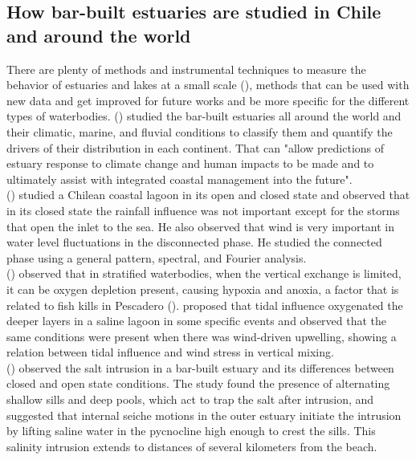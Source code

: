 \documentclass[11pt,letterpaper]{article}
\begin{document}
\subsection{How bar-built estuaries are studied in Chile and around the world}

There are plenty of methods and instrumental techniques to measure the behavior of estuaries and lakes at a small scale (\cite{Wuest2003}), methods that can be used with new data and get improved for future works and be more specific for the different types of waterbodies. \citeauthor{mcsweeney2017intermittently} (\cite*{mcsweeney2017intermittently}) studied the bar-built estuaries all around the world and their climatic, marine, and fluvial conditions to classify them and quantify the drivers of their distribution in each continent. That can "allow predictions of estuary response to climate change and human impacts to be made and to ultimately assist with integrated coastal management into the future".\\

\citeauthor{dussaillant2009} (\cite*{dussaillant2009}) studied a Chilean coastal lagoon in its open and closed state and observed that in its closed state the rainfall influence was not important except for the storms that open the inlet to the sea. He also observed that wind is very important in water level fluctuations in the disconnected phase. He studied the connected phase using a general pattern, spectral, and Fourier analysis.\\

\citeauthor{Kelly2018} (\cite*{Kelly2018}) observed that in stratified waterbodies, when the vertical exchange is limited, it can be oxygen depletion present, causing hypoxia and anoxia, a factor that is related to fish kills in Pescadero (\cite{largier2015}). \citeauthor{Kelly2018} proposed that tidal influence oxygenated the deeper layers in a saline lagoon in some specific events and observed that the same conditions were present when there was wind-driven upwelling, showing a relation between tidal influence and wind stress in vertical mixing.\\

\citeauthor{Behrens2016} (\cite*{Behrens2016}) observed the salt intrusion in a bar-built estuary and its differences between closed and open state conditions. The study found the presence of alternating shallow sills and deep pools, which act to trap the salt after intrusion, and suggested that internal seiche motions in the outer estuary initiate the intrusion by lifting saline water in the pycnocline high enough to crest the sills. This salinity intrusion extends to distances of several kilometers from the beach.\\
\end{document}
